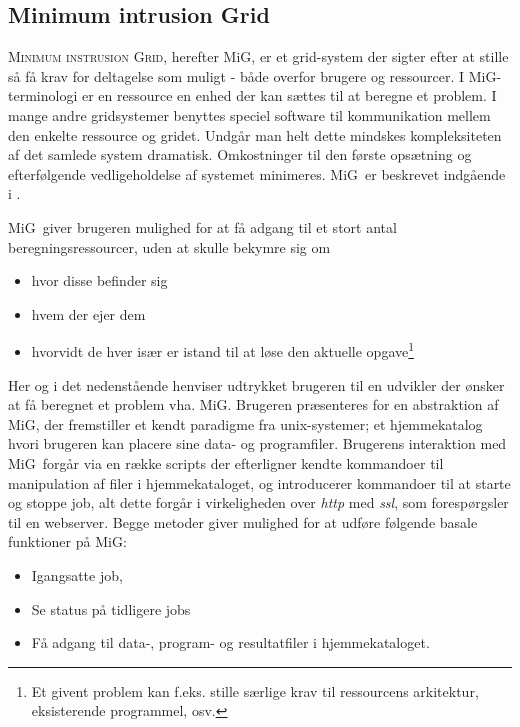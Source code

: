 \documentclass[pdf,draft,a4paper,11pt]{article}
\newcommand{\mig}{MiG}
\begin{document}
\subsection{Minimum intrusion Grid}\label{mig}

\textsc{Minimum instrusion Grid}, herefter \mig, er et grid-system der sigter efter at stille så få krav for deltagelse som muligt - både overfor brugere og ressourcer. I \mig-terminologi er en ressource en enhed der kan sættes til at beregne et problem. I mange andre gridsystemer benyttes speciel software til kommunikation mellem den enkelte ressource og gridet. Undgår man helt dette mindskes kompleksiteten af det samlede system dramatisk. Omkostninger til den første opsætning og efterfølgende vedligeholdelse af systemet minimeres.  \mig\ er beskrevet indgående i \cite{simplemig,mig}.

\mig\ giver brugeren mulighed for at få adgang til et stort antal beregningsressourcer, uden at skulle bekymre sig om 
\begin{itemize}
	\item hvor disse befinder sig
	\item hvem der ejer dem
	\item hvorvidt de hver især er istand til at løse den aktuelle opgave\footnote{Et givent problem kan f.eks. stille særlige krav til ressourcens arkitektur, eksisterende programmel, osv.}
\end{itemize}
Her og i det nedenstående henviser udtrykket brugeren til en udvikler der ønsker at få beregnet et problem vha. \mig . Brugeren præsenteres for en abstraktion af \mig, der fremstiller et kendt paradigme fra unix-systemer; et hjemmekatalog hvori brugeren kan placere sine data- og programfiler. Brugerens interaktion med \mig\ forgår via en række scripts der efterligner kendte kommandoer til manipulation af filer i hjemmekataloget, og introducerer kommandoer til at starte og stoppe job, alt dette forgår i virkeligheden over \emph{http} med \emph{ssl}, som forespørgsler til en webserver. 
Begge metoder giver mulighed for at udføre følgende basale funktioner på \mig:
\begin{itemize}
	\item Igangsatte job, 

	\item Se status på tidligere jobs

	\item Få adgang til data-, program- og resultatfiler i hjemmekataloget. 
\end{itemize}
\end{document}

